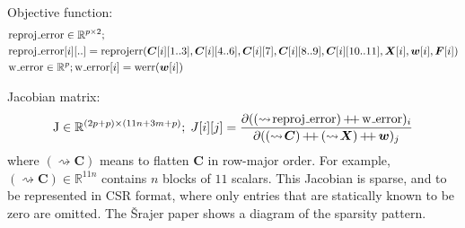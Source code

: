 \documentclass[11pt]{article}
\newcommand\R{\mathbb R}
\newcommand\append{\mathop{+\mkern-4mu+}}
\newcommand\flatten[1]{{(\rightsquigarrow\!#1)}}
\begin{document}
Objective function:
\begin{align*}
&\mathrm{reproj\mathunderscore{}error} \in \R^{p \times 2} ; \\
&\mathrm{reproj\mathunderscore{}error}[i][..] = \mathrm{reprojerr}(\bm{C}[i][1..3], \bm{C}[i][4..6], \bm{C}[i][7], \bm{C}[i][8..9], \bm{C}[i][10..11], \bm{X}[i], \bm{w}[i], \bm{F}[i]) \\
&\mathrm{w\mathunderscore{}error} \in \R^p ;
\mathrm{w\mathunderscore{}error}[i] = \mathrm{werr}(\bm{w}[i])
\end{align*}

Jacobian matrix:
\begin{align*}
\mathrm{J} \in \R^{(2p + p) \times (11n + 3m + p)} ;\;
J[i][j] = \frac{\partial (\flatten{\mathrm{reproj\mathunderscore{}error}} \append \mathrm{w\mathunderscore{}error})_i}{\partial (\flatten{\bm{C}} \append \flatten{\bm{X}} \append \bm{w})_j}
\end{align*}
where $\flatten{\bm{C}}$ means to flatten $\bm{C}$ in row-major order.
For example, $\flatten{\bm{C}} \in \R^{11n}$ contains $n$ blocks of $11$ scalars.
This Jacobian is sparse, and to be represented in CSR format, where only entries that are statically known to be zero are omitted.
The \v{S}rajer paper shows a diagram of the sparsity pattern.
\end{document}

